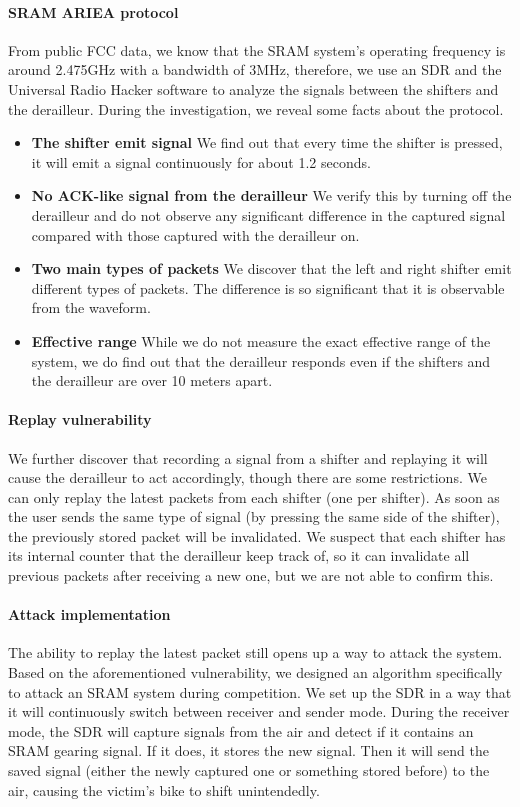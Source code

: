 \documentclass[letterpaper,twocolumn,10pt]{article}
\begin{document}
\paragraph{SRAM ARIEA protocol} From public FCC data, we know that the SRAM system's operating frequency is around 2.475GHz with a bandwidth of 3MHz, therefore, we use an SDR and the Universal Radio Hacker software \cite{urh} to analyze the signals between the shifters and the derailleur. During the investigation, we reveal some facts about the protocol.
\begin{itemize}
  \item \textbf{The shifter emit signal} We find out that every time the shifter is pressed, it will emit a signal continuously for about 1.2 seconds.
  \item \textbf{No ACK-like signal from the derailleur} We verify this by turning off the derailleur and do not observe any significant difference in the captured signal compared with those captured with the derailleur on.
  \item \textbf{Two main types of packets} We discover that the left and right shifter emit different types of packets. The difference is so significant that it is observable from the waveform.
  \item \textbf{Effective range} While we do not measure the exact effective range of the system, we do find out that the derailleur responds even if the shifters and the derailleur are over 10 meters apart.
\end{itemize}

\paragraph{Replay vulnerability}
We further discover that recording a signal from a shifter and replaying it will cause the derailleur to act accordingly, though there are some restrictions. We can only replay the latest packets from each shifter (one per shifter). As soon as the user sends the same
type of signal (by pressing the same side of the shifter), the previously stored packet will be invalidated. We suspect that each shifter has its internal counter that the derailleur keep track of, so it can invalidate all previous packets after receiving a new one, but we are not able to confirm this.

\paragraph{Attack implementation} The ability to replay the latest packet still opens up a way to attack the system. Based on the aforementioned vulnerability, we designed an algorithm specifically to attack an SRAM system during competition. We set up the SDR in a way that it will continuously switch between receiver and sender mode. During the receiver mode, the SDR will capture signals from the air and detect if it contains an SRAM gearing signal. If it does, it stores the new signal. Then it will send the saved signal (either the newly captured one or something stored before) to the air, causing the victim's bike to shift unintendedly.
\end{document}
